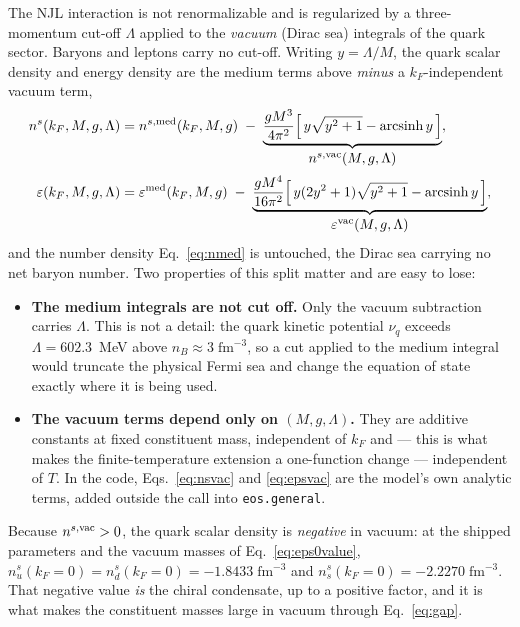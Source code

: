 \documentclass[aps,prc,onecolumn,superscriptaddress,nofootinbib,10pt]{revtex4-2}
\newcommand{\nB}{n_B}
\newcommand{\kF}{k_F}
\begin{document}
The NJL interaction is not renormalizable and is regularized by a
three-momentum cut-off $\Lambda$ applied to the \emph{vacuum} (Dirac sea)
integrals of the quark sector. Baryons and leptons carry no cut-off. Writing
$y = \Lambda/M$, the quark scalar density and energy density are the medium
terms above \emph{minus} a $\kF$-independent vacuum term,
%
\begin{align}
n^s(\kF, M, g, \Lambda) &= n^{s,{\rm med}}(\kF, M, g)
  \;-\; \underbrace{\frac{g M^3}{4\pi^2}
        \Big[\, y\sqrt{y^2+1} - \operatorname{arcsinh} y \,\Big]}_{
        \textstyle n^{s,{\rm vac}}(M, g, \Lambda)} ,
\label{eq:nsvac}\\[2pt]
\varepsilon(\kF, M, g, \Lambda) &= \varepsilon^{\rm med}(\kF, M, g)
  \;-\; \underbrace{\frac{g M^4}{16\pi^2}
        \Big[\, y(2y^2+1)\sqrt{y^2+1} - \operatorname{arcsinh} y \,\Big]}_{
        \textstyle \varepsilon^{\rm vac}(M, g, \Lambda)} ,
\label{eq:epsvac}
\end{align}
%
and the number density Eq.~\eqref{eq:nmed} is untouched, the Dirac sea
carrying no net baryon number. Two properties of this split matter and are
easy to lose:

\begin{itemize}
\item \textbf{The medium integrals are not cut off.} Only the vacuum
  subtraction carries $\Lambda$. This is not a detail: the quark kinetic
  potential $\nu_q$ exceeds $\Lambda = 602.3$~MeV above
  $\nB \approx 3\;\mathrm{fm^{-3}}$, so a cut applied to the medium integral
  would truncate the physical Fermi sea and change the equation of state
  exactly where it is being used.
\item \textbf{The vacuum terms depend only on $(M, g, \Lambda)$.} They are
  additive constants at fixed constituent mass, independent of $\kF$ and ---
  this is what makes the finite-temperature extension a one-function change ---
  independent of $T$. In the code, Eqs.~\eqref{eq:nsvac} and
  \eqref{eq:epsvac} are the model's own analytic terms, added outside the
  call into \texttt{eos.general}.
\end{itemize}

\noindent
Because $n^{s,{\rm vac}} > 0$, the quark scalar density is \emph{negative} in
vacuum: at the shipped parameters and the vacuum masses of
Eq.~\eqref{eq:eps0value}, $n^s_u(\kF = 0) = n^s_d(\kF = 0) =
-1.8433\;\mathrm{fm^{-3}}$ and $n^s_s(\kF = 0) = -2.2270\;\mathrm{fm^{-3}}$.
That negative value
\emph{is} the chiral condensate, up to a positive factor, and it is what makes
the constituent masses large in vacuum through Eq.~\eqref{eq:gap}.
\end{document}
